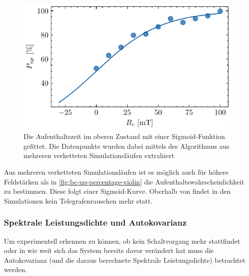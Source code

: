 \documentclass[main.tex]{subfiles}
\begin{document}
\begin{figure}[H]
    \centering
    \includegraphics{bilder/plots/max_Bz/up_percentage_fit.pdf}
    \caption{Die Aufenthaltszeit im oberen Zustand mit einer Sigmoid-Funktion gefittet. Die Datenpunkte wurden dabei mittels des Algorithmus aus mehreren verketteten Simulationsläufen extrahiert}\label{fig:bc-up-percentage}
\end{figure}

Aus mehreren verketteten Simulationsläufen ist es möglich auch für höhere Feldstärken als in \cref{fig:bc-up-percentage-violin} die Aufenthaltswahrscheinlichkeit zu bestimmen. Diese folgt einer Sigmoid-Kurve. Oberhalb von  findet in den Simulationen kein Telegrafenrauschen mehr statt.

\newpage
\subsubsection{Spektrale Leistungsdichte und Autokovarianz}

Um experimentell erkennen zu können, ob kein Schaltvorgang mehr stattfindet oder in wie weit sich das System bereits davor verändert hat muss die Autokovarianz (und die daraus berechnete Spektrale Leistungsdichte) betrachtet werden.

\end{document}
